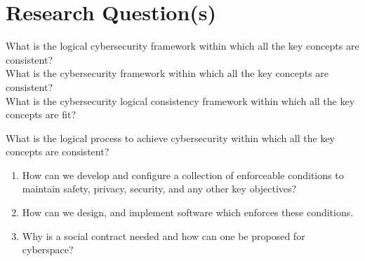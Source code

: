 {\section{Research Question(s)}
\if
What is the logical cybersecurity framework within which all the key concepts are consistent?\\
What is the cybersecurity framework within which all the key concepts are consistent?\\
What is the cybersecurity logical consistency framework within which all the key concepts are fit?\\
\fi

What is the logical process to achieve cybersecurity within which all the key concepts are consistent?
\begin{enumerate}
\item How can we develop and configure a collection of enforceable conditions to maintain safety, privacy, security, and any other key objectives?
\item How can we design, and implement software which enforces these conditions.  %
\item Why is a social contract needed and how can one be proposed for cyberspace?
\end{enumerate}



}
